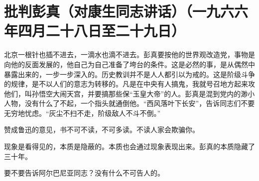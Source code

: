 \section[批判彭真（对康生同志讲话）（一九六六年四月二十八日至二十九日）]{批判彭真（对康生同志讲话）（一九六六年四月二十八日至二十九日）}


北京一根针也插不进去，一滴水也滴不进去。彭真要按他的世界观改造党，事物是向他的反面发展的，他自己为自己准备了垮台的条件。这是必然的事，是从偶然中暴露出来的，一步一步深入的。历史教训并不是人人都引以为戒的。这是阶级斗争的规律，是不以人们的意志为转移的。凡是在中央有人搞鬼，我就号召地方起来攻他们，叫孙悟空大闹天宫，并要搞那些保“玉皇大帝”的人。彭真是混到党内的渺小人物，没有什么了不起，一个指头就通倒他。“西风落叶下长安”，告诉同志们不要无穷地忧虑。“灰尘不扫不走，阶级敌人不斗不倒。”

赞成鲁迅的意见，书不可不读，不可多读。不读人家会欺骗你。

现象是看得见的，本质是隐蔽的。本质也会通过现象表现出来。彭真的本质隐藏了三十年。

要不要告诉阿尔巴尼亚同志？没有什么不可告人的。

